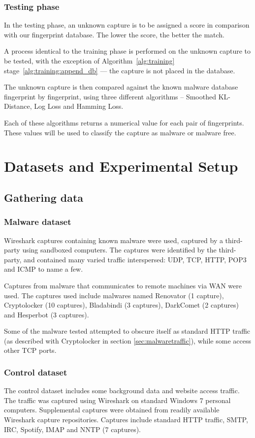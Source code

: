 \documentclass[13pt,journal,compsoc,onecolumn]{IEEEtran}
\begin{document}
\subsubsection{Testing phase}
In the testing phase, an unknown capture is to be assigned a score in comparison with our fingerprint database. The lower the score, the better the match.

A process identical to the training phase is performed on the unknown capture to be tested, with the exception of Algorithm~\ref{alg:training} stage~\ref{alg:training:append_db} --- the capture is not placed in the database.
 
The unknown capture is then compared against the known malware database fingerprint by fingerprint, using three different algorithms – Smoothed KL-Distance, Log Loss and Hamming Loss.

Each of these algorithms returns a numerical value for each pair of fingerprints. These values will be used to classify the capture as malware or malware free.
\section{Datasets and Experimental Setup}
\subsection{Gathering data}
\subsubsection{Malware dataset}
Wireshark captures containing known malware were used, captured by a third-party using sandboxed computers.
The captures were identified by the third-party, and contained many varied traffic interspersed: UDP, TCP, HTTP, POP3 and ICMP to name a few.

Captures from malware that communicates to remote machines via WAN were used.
The captures used include malwares named Renovator (1 capture),  Cryptolocker (10 captures), Bladabindi (3 captures), DarkComet (2 captures) and Hesperbot (3 captures).

Some of the malware tested attempted to obscure itself as standard HTTP traffic (as described with Cryptolocker in section \ref{sec:malwaretraffic}), while some access other TCP ports.
\subsubsection{Control dataset}
The control dataset includes some background data and website access traffic.
The traffic was captured using Wireshark on standard Windows 7 personal computers. Supplemental captures were obtained from readily available Wireshark capture repositories.
Captures include standard HTTP traffic, SMTP, IRC, Spotify, IMAP and NNTP (7 captures).
\end{document}
